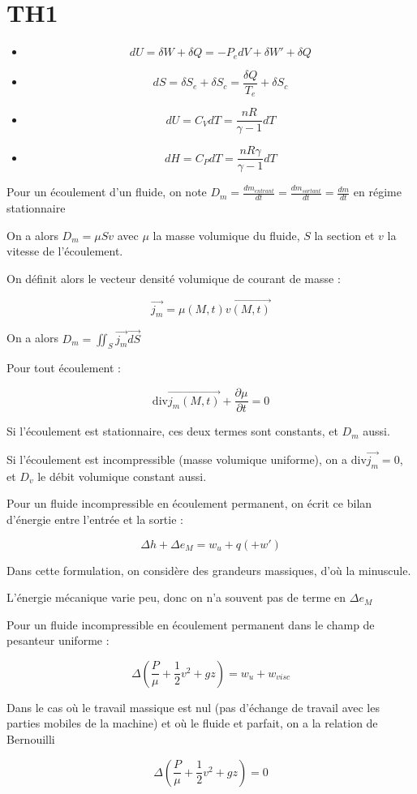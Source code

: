 \documentclass[a4paper,12pt]{book}
\newcommand{\Def}[2]{\begin{tcolorbox}[colback=white,colframe=red!10!green!20!blue!75!, title=Définition : #1]#2\end{tcolorbox}}
\newcommand{\Thr}[2]{\begin{tcolorbox}[sharp corners, colback=white,colframe=red!10!blue!30!green!75!, title=Théorème : #1]#2\end{tcolorbox}}
\newcommand{\Div}{\mathrm{div}}
\renewcommand{\Vec}[1]{\overrightarrow{#1}}
\begin{document}
\section{TH1}
\Thr{Identités thermodynamiques}{\begin{itemize}
\item $$dU = \delta W + \delta Q = -P_edV +\delta W' +\delta Q$$
\item $$dS = \delta S_e+\delta S_c = \frac{\delta Q}{T_e}+\delta S_c$$
\item $$dU = C_VdT = \frac{nR}{\gamma-1}dT$$
\item $$dH = C_PdT = \frac{nR\gamma}{\gamma-1}dT$$
\end{itemize}}
\Def{Débit massique}{Pour un écoulement d'un fluide, on note $D_m = \frac{dm_{entrant}}{dt} =\frac{dm_{sortant}}{dt}=\frac{dm}{dt}$ en régime stationnaire
\par On a alors $D_m = \mu S v$ avec $\mu$ la masse volumique du fluide, $S$ la section et $v$ la vitesse de l'écoulement.
\par On définit alors le vecteur densité volumique de courant de masse :
\par $$\Vec{j_m} = \mu(M,t)\Vec{v(M,t)}$$
\par On a alors $D_m = \iint_S\Vec{j_m}\Vec{dS}$}
\Thr{Conservation de la masse}{Pour tout écoulement :
\par $$\Div\Vec{j_m(M,t)}+\dfrac{\partial\mu}{\partial t}=0$$
\par Si l'écoulement est stationnaire, ces deux termes sont constants, et $D_m$ aussi.
\par Si l'écoulement est incompressible (masse volumique uniforme), on a $\Div\Vec{j_m}=0$, et $D_v$ le débit volumique constant aussi.}
\Thr{Premier principe en écoulement}{Pour un fluide incompressible en écoulement permanent, on écrit ce bilan d'énergie entre l'entrée et la sortie :
\par $$\Delta h+\Delta e_M=w_u+q(+w')$$
\par Dans cette formulation, on considère des grandeurs massiques, d'où la minuscule.
\par L'énergie mécanique varie peu, donc on n'a souvent pas de terme en $\Delta e_M$}
\Thr{Théorème de Bernouilli}{Pour un fluide incompressible en écoulement permanent dans le champ de pesanteur uniforme :
\par $$\Delta\left(\frac{P}{\mu}+\frac{1}{2}v^2+gz\right)=w_u+w_{visc}$$
\par Dans le cas où le travail massique est nul (pas d'échange de travail avec les parties mobiles de la machine) et où le fluide et parfait, on a la relation de Bernouilli
\par $$\Delta\left(\frac{P}{\mu}+\frac{1}{2}v^2+gz\right)=0$$}
\end{document}
